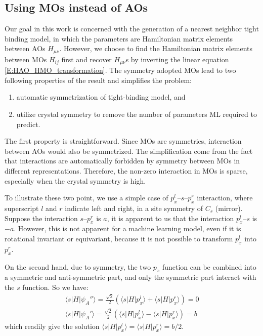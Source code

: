 \documentclass{article}
\begin{document}
\subsection{Using MOs instead of AOs}
Our goal in this work is concerned with the generation of a nearest neighbor tight binding model, in which 
the parameters are Hamiltonian matrix elements between AOs $H_{\mu\nu}$. However, we choose to find 
the Hamiltonian matrix elements between MOs $H_{ij}$ first and recover $H_{\mu\nu}$s by inverting the linear equation \eqref{E:HAO_HMO_transformation}.
The symmetry adopted MOs lead to two following properties of the 
result and simplifies the problem:
\begin{enumerate}
    \item automatic symmetrization of tight-binding model, and 
    \item utilize crystal symmetry to remove the number of parameters ML required to predict.
\end{enumerate}
The first property is straightforward. Since MOs are symmetries, interaction between AOs would also be symmetrized. The simplification come 
from the fact that interactions are automatically forbidden by symmetry between MOs in different representations. Therefore, the non-zero interaction 
in MOs is sparse, especially when the crystal symmetry is high. 

To illustrate these two point, we use a simple case of $p_x^l$--$s$--$p_x^r$ interaction, where superscript $l$ and $r$ indicate left and right, in 
a site symmetry of $C_s$ (mirror). Suppose the interaction $s$--$p_x^r$ is $a$, it is apparent to us that the interaction $p_x^l$--$s$ is $-a$. However,
this is not apparent for a machine learning model, even if it is rotational invariant or equivariant, because it is not possible to transform $p_x^l$
into $p_x^r$. 

On the second hand, due to symmetry, the two $p_x$ function can be combined into a symmetric and anti-symmetric part, and 
only the symmetric part interact with the $s$ function. So we have:
\begin{align}
    \label{E:px_s_AO_MO}
    \langle s | H | \psi_A'' \rangle = \frac{\sqrt{2}}{2} \left( \langle s | H | p_x^l \rangle + \langle s | H | p_x^r \rangle\right) = 0 \\
    \langle s | H | \psi_A' \rangle = \frac{\sqrt{2}}{2} \left( \langle s | H | p_x^l \rangle - \langle s | H | p_x^r \rangle\right) = b
\end{align}
which readily give the solution  $\langle s | H | p_x^l \rangle = \langle s | H | p_x^r \rangle = b/2$.
\end{document}
